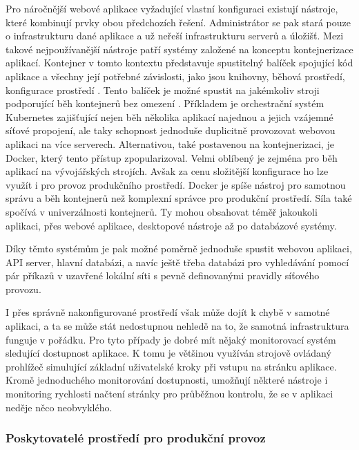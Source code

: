 		Pro náročnější webové aplikace vyžadující vlastní konfiguraci existují nástroje, které kombinují prvky
		obou předchozích řešení.
		Administrátor se pak stará pouze o infrastrukturu dané aplikace a už neřeší infrastrukturu serverů a úložišť.
		Mezi takové nejpoužívanější nástroje patří systémy založené na konceptu kontejnerizace aplikací.
		Kontejner v tomto kontextu představuje spustitelný balíček spojující kód aplikace a všechny její potřebné závislosti, jako jsou
		knihovny, běhová prostředí, konfigurace prostředí \cite{what_is_container}.
		Tento balíček je možné spustit na jakémkoliv stroji podporující
		běh kontejnerů bez omezení \cite{what_is_container}.
		Příkladem je orchestrační systém Kubernetes zajišťující nejen běh několika aplikací najednou a jejich vzájemné síťové propojení,
		ale taky schopnost jednoduše duplicitně provozovat webovou aplikaci na více serverech.
		Alternativou, také postavenou na kontejnerizaci, je Docker, který tento přístup zpopularizoval.
		Velmi oblíbený je zejména pro běh aplikací na vývojářských strojích.
		Avšak za cenu složitější konfigurace ho lze využít i pro provoz produkčního prostředí.
		Docker je spíše nástroj pro samotnou správu a běh kontejnerů než komplexní správce pro produkční prostředí.
		Síla také spočívá v univerzálnosti kontejnerů.
		Ty mohou obsahovat téměř jakoukoli aplikaci, přes webové aplikace, desktopové nástroje až po databázové systémy.

		Díky těmto systémům je pak možné poměrně jednoduše spustit webovou aplikaci, API server, hlavní databázi,
		a navíc ještě třeba databázi pro vyhledávání pomocí pár příkazů v uzavřené lokální síti
		s pevně definovanými pravidly síťového provozu.

		I přes správně nakonfigurované prostředí však může dojít k chybě v samotné aplikaci, a ta se může stát nedostupnou
		nehledě na to, že samotná infrastruktura funguje v pořádku.
		Pro tyto případy je dobré mít nějaký monitorovací systém sledující dostupnost aplikace.
		K tomu je většinou využíván strojově ovládaný prohlížeč simulující základní uživatelské kroky při vstupu na stránku
		aplikace.
		Kromě jednoduchého monitorování dostupnosti, umožňují některé nástroje i monitoring rychlosti načtení stránky pro
		průběžnou kontrolu, že se v aplikaci neděje něco neobvyklého.

		\subsubsection{Poskytovatelé prostředí pro produkční provoz}

